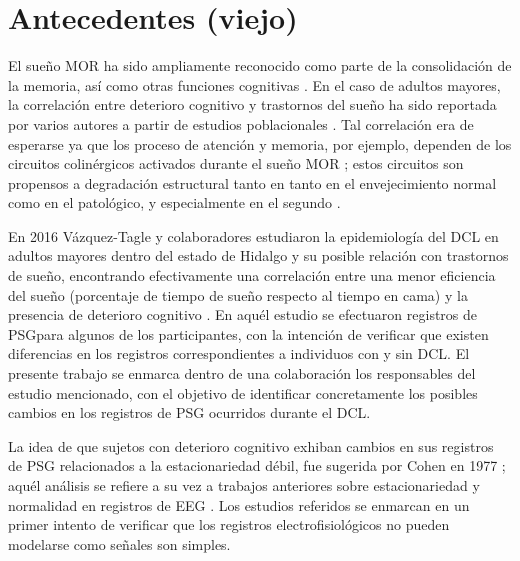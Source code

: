 \section{Antecedentes (viejo)}

El sueño MOR ha sido ampliamente reconocido como parte de la consolidación de la memoria, así como
otras funciones cognitivas 
\cite{Fishbein1971,Fishbein1977,Lucero1970,Pearlman1971,Pearlman1974,Smith1991}.
%
En el caso de adultos mayores, la correlación entre deterioro cognitivo y trastornos del sueño ha 
sido reportada por varios autores a partir de estudios poblacionales 
\cite{Amer13,Miyata13,Reid06,Potvin12}.
%
Tal correlación era de esperarse ya que los proceso de atención y memoria, por ejemplo, dependen de 
los circuitos colinérgicos activados durante el sueño MOR \cite{Braun1997}; estos circuitos son 
propensos a degradación estructural tanto en tanto en el envejecimiento normal como en el 
patológico,  y especialmente en el segundo \cite{Schliebs11}.

En 2016 Vázquez-Tagle y colaboradores estudiaron la epidemiología del DCL en adultos mayores dentro 
del estado de Hidalgo y su posible relación con trastornos de sueño, encontrando efectivamente una 
correlación entre una menor eficiencia del sueño (porcentaje de tiempo de sueño respecto al tiempo 
en cama) y la presencia de deterioro cognitivo \cite{VazquezTagle16}.
%
En aquél estudio se efectuaron registros de PSGpara algunos de los participantes, con la intención 
de verificar que existen diferencias en los registros correspondientes a individuos con y sin DCL.
%
El presente trabajo se enmarca dentro de una colaboración los responsables del estudio mencionado, 
con el objetivo de identificar concretamente los posibles cambios en los registros de PSG 
ocurridos durante el DCL.

La idea de que sujetos con deterioro cognitivo exhiban cambios en sus registros de PSG relacionados 
a la estacionariedad débil, fue sugerida por Cohen en 1977 \cite{Cohen77}; aquél análisis se 
refiere a su vez a trabajos anteriores sobre estacionariedad y normalidad en registros de EEG
\cite{McEwen75,Sugimoto78,Kawabata73}.
%
Los estudios referidos se enmarcan en un primer intento de verificar que los registros 
electrofisiológicos no pueden modelarse como señales son simples.


